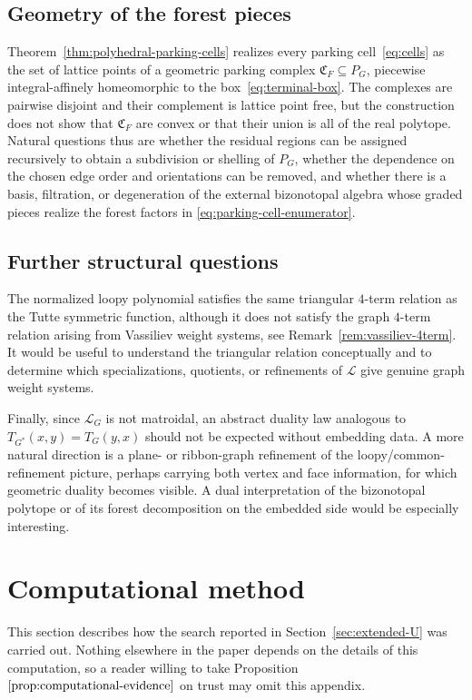 \documentclass[11pt]{article}
\theoremstyle{plain}
\theoremstyle{definition}
\renewcommand{\mathcal}{\mathscr}
\newcommand{\LL}{\mathcal{L}}    %
\newcommand{\fC}{\mathfrak C}    %
\numberwithin{equation}{section}
\begin{document}
\subsection{Geometry of the forest pieces}
\label{subsec:outlook-geometry}

Theorem~\ref{thm:polyhedral-parking-cells} realizes every parking cell~\eqref{eq:cells}
as the set of lattice points of a geometric parking complex $\fC_F\subseteq P_G$,
piecewise integral-affinely homeomorphic to the box~\eqref{eq:terminal-box}.
The complexes are pairwise disjoint and their complement is lattice point free, but
the construction does not show that $\fC_F$ are
convex or that their union is all of the real polytope.  Natural questions thus are
whether the residual regions can be assigned recursively
to obtain a subdivision or shelling of $P_G$,
whether  the dependence on the chosen edge order and orientations can be removed, and
whether there is a basis, filtration, or degeneration of the external
bizonotopal algebra whose graded pieces realize the forest factors in
\eqref{eq:parking-cell-enumerator}.

\subsection{Further structural questions}
\label{subsec:outlook-structural}

The normalized loopy polynomial satisfies the same triangular $4$-term
relation as the Tutte symmetric function, although it does not satisfy the
graph $4$-term relation arising from Vassiliev weight systems, see
Remark~\ref{rem:vassiliev-4term}.  It would be useful to understand the
triangular relation conceptually and to determine which specializations,
quotients, or refinements of $\LL$ give genuine graph weight systems.

Finally, since $\LL_G$ is not matroidal, an abstract duality law analogous to
$T_{G^*}(x,y)=T_G(y,x)$ should not be expected without embedding data.  A more
natural direction is a plane- or ribbon-graph refinement of the loopy/common-refinement picture,
perhaps carrying both vertex and face information, for which geometric duality becomes visible.
A dual interpretation of the bizonotopal polytope or of its forest decomposition
on the embedded side would be especially interesting.

\appendix

\section{Computational method}
\label{sec:the-computation}
This section describes how the search reported in
Section~\ref{sec:extended-U} was carried out.
Nothing elsewhere in the paper depends on the details of this computation,
so a reader willing to take Proposition \(\ref{prop:computational-evidence}\) on trust may omit this appendix.
\end{document}
